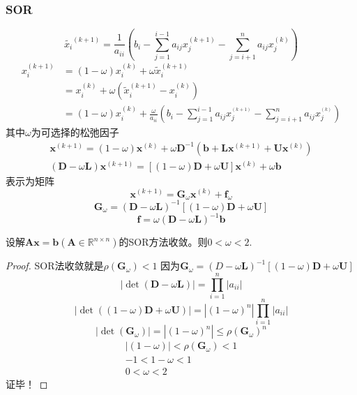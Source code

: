 \subsubsection{SOR}
\[
    \widetilde{x_i}^{(k+1)}=\frac1{a_{ii}}(b_i-\sum_{j=1}^{i-1}a_{ij}x_j^{(k+1)}-\sum_{j=i+1}^na_{ij}x_j^{(k)})
\]
\[
    \begin{aligned}
        x_{i}^{(k+1)}&=(1-\omega)x_{i}^{(k)}+\omega\widetilde{x}_{i}^{(k+1)}\\
        &=x_{i}^{(k)}+\omega\left(\widetilde{x}_{i}^{(k+1)}-x_{i}^{(k)}\right)\\
        &=(1-\omega)x_{i}^{(k)}+\frac{\omega}{a_{ii}}(b_{i}-\sum_{j=1}^{i-1}a_{ij}x_{j}^{^{(k+1)}}-\sum_{j=i+1}^{n}a_{ij}x_{j}^{^{(k)}})
    \end{aligned}
\]
其中$\omega$为可选择的松弛因子
\[
    \begin{array}{l}
        \boldsymbol{x}^{(k+1)} = (1-\omega)\boldsymbol{x}^{(k)}+\omega \boldsymbol{D}^{-1}\left( \boldsymbol{b}+\boldsymbol{L}\boldsymbol{x}^{(k+1)}+\boldsymbol{U}\boldsymbol{x}^{(k)} \right)\\
        (\boldsymbol{D}-\omega \boldsymbol{L})\boldsymbol{x}^{(k+1)} = [(1-\omega)\boldsymbol{D}+\omega \boldsymbol{U}]\boldsymbol{x}^{(k)} + \omega \boldsymbol{b}
    \end{array}
\]
表示为矩阵
\[
    \boldsymbol{x}^{(k+1)}=\boldsymbol{G}_\omega \boldsymbol{x}^{(k)}+\boldsymbol{f}_\omega 
\]
\[
    \boldsymbol{G}_\omega=(\boldsymbol{D}-\omega \boldsymbol{L})^{-1}[(1-\omega)\boldsymbol{D}+\omega \boldsymbol{U}]
\]
\[
    \boldsymbol{f}=\omega(\boldsymbol{D}-\omega \boldsymbol{L})^{-1}\boldsymbol{b}
\]
\begin{theorem}[(SOR方法收敛的必要条件)]
设解$\boldsymbol{Ax}=\boldsymbol{b}(\boldsymbol{A}\in\mathbb{R}^{n\times n})$的SOR方法收敛。则$0<\omega<2.$
\end{theorem}
\begin{proof}
    SOR法收敛就是$\rho(\boldsymbol{G}_\omega) <1$
    因为$\boldsymbol{G}_\omega = (D-\omega\boldsymbol{L})^{-1}[(1-\omega)\boldsymbol{D}+\omega\boldsymbol{U}]$
    \[
        |\det(\boldsymbol{D}-\omega \boldsymbol{L})| = \prod_{i = 1}^{n}|a_{ii}|
    \]
    \[
        |\det((1-\omega)\boldsymbol{D}+\omega \boldsymbol{U})| = |(1-\omega)^n|\prod_{i = 1}^{n}|a_{ii}|
    \]
    \[
        |\det (\boldsymbol{G}_{\omega})| = |(1-\omega)^n|\leq \rho(\boldsymbol{G}_{\omega})^{n}
    \]
    \[
        \begin{array}{l}
            |(1-\omega)|< \rho(\boldsymbol{G}_{\omega})<1\\
            -1<1-\omega<1\\
            0<\omega<2
        \end{array}
    \]
    证毕！
\end{proof}
